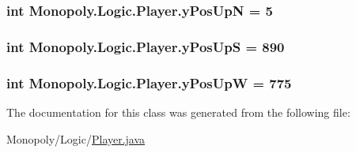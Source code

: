 \subsubsection[{\texorpdfstring{y\+Pos\+UpN}{yPosUpN}}]{\setlength{\rightskip}{0pt plus 5cm}int Monopoly.\+Logic.\+Player.\+y\+Pos\+UpN = 5\hspace{0.3cm}{\ttfamily [private]}}\hypertarget{class_monopoly_1_1_logic_1_1_player_a002cfe6e26e108f3f3ad2bbe0aedac7a}{}\label{class_monopoly_1_1_logic_1_1_player_a002cfe6e26e108f3f3ad2bbe0aedac7a}
\subsubsection[{\texorpdfstring{y\+Pos\+UpS}{yPosUpS}}]{\setlength{\rightskip}{0pt plus 5cm}int Monopoly.\+Logic.\+Player.\+y\+Pos\+UpS = 890\hspace{0.3cm}{\ttfamily [private]}}\hypertarget{class_monopoly_1_1_logic_1_1_player_aca5512a435a1aa40f6457bf1b19ba399}{}\label{class_monopoly_1_1_logic_1_1_player_aca5512a435a1aa40f6457bf1b19ba399}
\subsubsection[{\texorpdfstring{y\+Pos\+UpW}{yPosUpW}}]{\setlength{\rightskip}{0pt plus 5cm}int Monopoly.\+Logic.\+Player.\+y\+Pos\+UpW = 775\hspace{0.3cm}{\ttfamily [private]}}\hypertarget{class_monopoly_1_1_logic_1_1_player_a3de6131b99c15ef2a56b99252253db7f}{}\label{class_monopoly_1_1_logic_1_1_player_a3de6131b99c15ef2a56b99252253db7f}


The documentation for this class was generated from the following file\+:\begin{DoxyCompactItemize}
\item 
Monopoly/\+Logic/\hyperlink{_player_8java}{Player.\+java}\end{DoxyCompactItemize}
